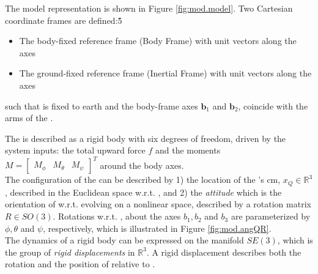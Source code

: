 The  model representation is shown in Figure \ref{fig:mod.model}. Two Cartesian coordinate frames are defined:\v{5}
\begin{itemize}
	\setlength\itemsep{.2pt}
	\item The body-fixed reference frame  (Body Frame)
	\subitem with unit vectors  along the axes
	\item The ground-fixed reference frame  (Inertial Frame)
	\subitem with unit vectors  along the axes								
\end{itemize}
such that \IF is fixed to earth and the body-frame axes $ \mathbf{b}_1$ and $\mathbf{b}_2 $, coincide with the arms of the .

The  is described as a rigid body with six degrees of freedom, driven by the system inputs: the total upward force $ f $ and the moments $ M=\begin{bmatrix}	M_\phi&M_\theta&M_\psi	\end{bmatrix}^T $ around the body axes. \\
The configuration of the  can be described by 1) the location of the 's \acf{cm}, $x_Q\in \mathbb{R}^3 $, described in the Euclidean space w.r.t. \IF, and 2) the \textit{attitude} which is the orientation of \BF w.r.t. \IF evolving on a nonlinear space, described by a rotation matrix $R\in SO(3) $. 
Rotations w.r.t. \BF, about the axes $ b_1,b_2 $ and $ b_3 $ are parameterized by $ \phi,\theta $ and $ \psi $, respectively, which is illustrated in Figure \ref{fig:mod.angQR}.\\
The dynamics of a rigid body can be expressed on the manifold $ SE(3) $, which is the group of \textit{rigid displacements} in $ \mathbb{R}^3 $. A rigid displacement describes both the rotation and the position of \BF relative to \IF.

